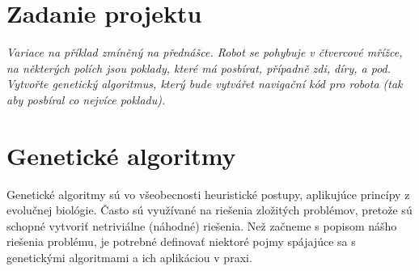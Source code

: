 \documentclass[10pt]{paper}
\begin{document}

\section{Zadanie projektu}

\textit{Variace na příklad zmíněný na přednášce. Robot se pohybuje v čtvercové mřížce, na některých polích jsou poklady, které má posbírat, případně zdi, díry, a pod. Vytvořte genetický algoritmus, který bude vytvářet navigační kód pro robota (tak aby posbíral co nejvíce pokladu).}

\section{Genetické algoritmy}
 
Genetické algoritmy sú vo všeobecnosti heuristické postupy, aplikujúce princípy z evolučnej biológie. Často sú využívané na riešenia zložitých problémov, pretože sú schopné vytvoriť netriviálne (náhodné) riešenia. Než začneme s popisom nášho riešenia problému, je potrebné definovať niektoré pojmy spájajúce sa s genetickými algoritmami a ich aplikáciou v praxi.\\
\end{document}
